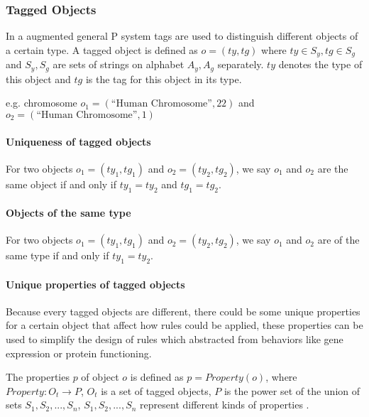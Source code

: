 \documentclass[9pt,a4paper,twoside]{article}
\begin{document}
        \subsubsection{Tagged Objects}
        
            In a augmented general P system tags are used to distinguish different objects of a certain type. 
            A tagged object is defined as $o = (ty, tg)$ where $ty \in S_y, tg \in S_g$ and $S_y, S_g$ are sets of strings on alphabet $A_y, A_g$ separately. 
            $ty$ denotes the type of this object and $tg$ is the tag for this object in its type.
            
            e.g. chromosome $o_1 = (\text{``Human Chromosome''}, 22)$ 
            and $o_2 = (\text{``Human Chromosome''}, 1)$
            \paragraph{Uniqueness of tagged objects}
            
                For two objects $o_1 = (ty_1, tg_1)$ and $o_2 = (ty_2, tg_2)$, we say $o_1$ and $o_2$ are the same object if and only if 
                $ty_1 = ty_2$ and $tg_1 = tg_2$.
            \paragraph{Objects of the same type}
            
                For two objects $o_1 = (ty_1, tg_1)$ and $o_2 = (ty_2, tg_2)$, we say $o_1$ and $o_2$ are of the same type if and only if 
                $ty_1 = ty_2$.
            \paragraph{Unique properties of tagged objects}
            
                Because every tagged objects are different, there could be some unique properties for a certain object that affect how rules could be 
                applied, these properties can be used to simplify the design of rules which abstracted from behaviors like gene expression or protein functioning.
                
                The properties $p$ of object $o$ is defined as $p = Property(o)$, where $Property: O_t \rightarrow P$, $O_t$ is a set of tagged objects,
                $P$ is the power set of the union of sets $S_1, S_2,...,S_n$, $S_1, S_2,...,S_n$ represent different kinds of properties .
                
\end{document}
